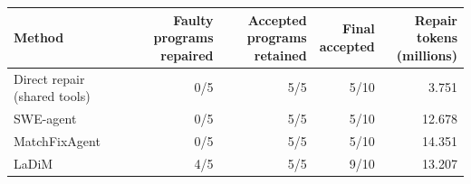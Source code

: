 \begin{tabular*}{\linewidth}{@{\extracolsep{\fill}}lrrrr@{}}
\toprule
\textbf{Method} & \thead{Faulty\\programs repaired} & \thead{Accepted programs\\retained} & \thead{Final\\accepted} & \thead{Repair tokens\\(millions)} \\
\midrule
Direct repair (shared tools) & 0/5 & 5/5 & 5/10 & 3.751 \\
SWE-agent & 0/5 & 5/5 & 5/10 & 12.678 \\
MatchFixAgent & 0/5 & 5/5 & 5/10 & 14.351 \\
LaDiM & 4/5 & 5/5 & 9/10 & 13.207 \\
\bottomrule
\end{tabular*}
